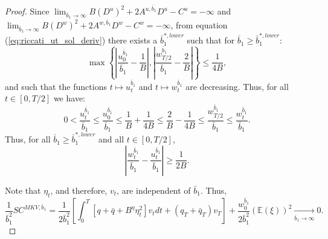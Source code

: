 \documentclass[11pt]{article}
\begin{document}
\begin{proof}
	Since $\lim_{\bar{b}_1 \to \infty}B (D^{u})^2 + 2 A^{u,\bar{b}_1} D^{u} - C^{u}=-\infty$ and $\lim_{\bar{b}_1 \to \infty}B (D^{w})^2 + 2 A^{w,\bar{b}_1} D^{w} - C^{w}=-\infty$,   from equation (\ref{eq:riccati_ut_sol_deriv}) there exists a $\bar{b}_1^{*,lower}$ such that for $\bar{b}_1 \geq \bar{b}_1^{*,lower}$:
	$$\max \left\{ \left|\frac{u^{\bar{b}_1}_0}{\bar{b}_1}-\frac{1}{B} \right|,\left|\frac{w^{\bar{b}_1}_{T/2}}{\bar{b}_1}-\frac{2}{B} \right| \right\} \leq \frac{1}{4B},$$
	and such that the functions $t \mapsto u_t^{\bar{b}_1}$ and $ t \mapsto w_t^{\bar{b}_1}$ are decreasing. Thus, for all $t \in [0, T/2]$ we have:
	\begin{equation*}
	    0< \frac{u_t^{\bar{b}_1}}{\bar{b}_1} \leq \frac{u_0^{\bar{b}_1}}{\bar{b}_1} \leq \frac{1}{B} + \frac{1}{4B}  \leq \frac{2}{B} - \frac{1}{4 B} \leq \frac{w_{T/2}^{\bar{b}_1}}{ \bar{b}_1} \leq \frac{w_t^{\bar{b}_1}}{\bar{b}_1}. 
	\end{equation*}
	Thus, for all $\bar{b}_1 \geq \bar{b}_1^{*,lower}$ and all $t \in [0,T/2]$,
	\begin{equation}
	  \left\vert  \frac{w^{\bar{b}_1}_t}{\bar{b}_1}-\frac{u^{\bar{b}_1}_t}{\bar{b}_1} \right\vert \geq \frac{1}{2B}.
	\label{eq:lower_bound_u_w}
	\end{equation}
	
	Note that $\eta_t$, and therefore, $v_t$, are independent of $\bar{b}_1$. Thus,
	\begin{equation*}
	\frac{1}{\bar{b}_1^2}SC^{MKV,\bar{b}_1}=\frac{1}{2\bar{b}_1^2}\left[\int_0^T \left[q+\bar{q} + B^{\eta} \eta_t^2 \right] v_t dt + (q_T + \bar{q}_T) v_T\right] + \frac{w^{\bar{b}_1}_0}{2\bar{b}_1^2} (\mathbb{E}(\xi))^2 \xrightarrow[\bar{b}_1 \to \infty]{}0.	
	\end{equation*}


\end{proof}
\end{document}

